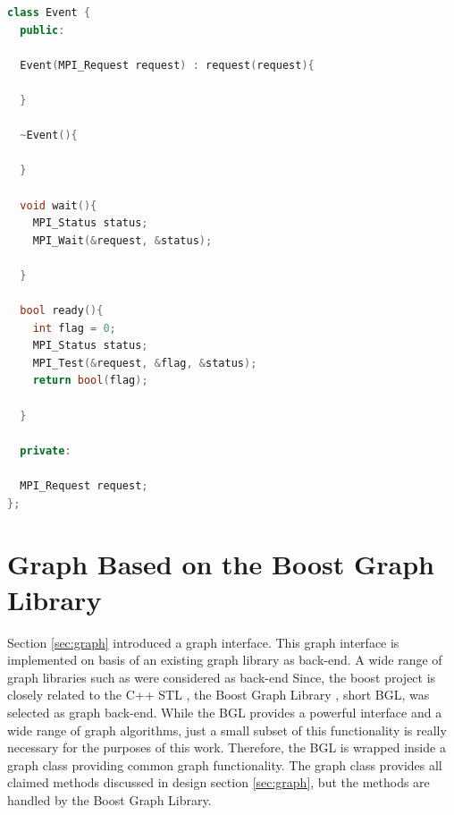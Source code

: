 \begin{lstlisting}[language=C++, label=lst:mpi_event]
class Event {
  public:

  Event(MPI_Request request) : request(request){
    
  }
  
  ~Event(){
    
  }

  void wait(){
    MPI_Status status;
    MPI_Wait(&request, &status);
    
  }

  bool ready(){
    int flag = 0;
    MPI_Status status;
    MPI_Test(&request, &flag, &status);
    return bool(flag);
    
  }
  
  private:
  
  MPI_Request request;
};  
\end{lstlisting}

\section{Graph Based on the Boost Graph Library}
Section \ref{sec:graph} introduced a graph interface.  This graph
interface is implemented on basis of an existing graph library as
back-end. A wide range of graph libraries such as \cite{ref:lemon,
  ref:boost_bgl, ref:igraph, ref:ogdf} were considered as back-end
Since, the boost project is closely related to the C++ STL , the Boost
Graph Library \cite{ref:boost_bgl}, short BGL, was selected as graph
back-end.  While the BGL provides a powerful interface and a wide
range of graph algorithms, just a small subset of this functionality
is really necessary for the purposes of this work. Therefore, the BGL
is wrapped inside a graph class providing common graph functionality.
The graph class provides all claimed methods discussed in design
section \ref{sec:graph}, but the methods are handled by the Boost
Graph Library.


